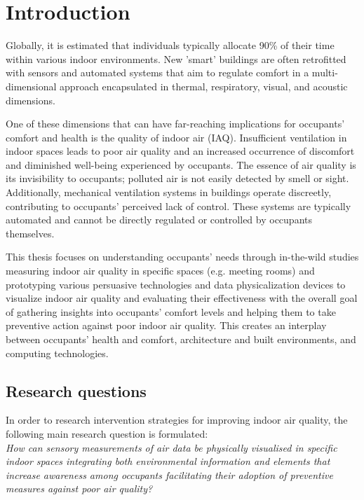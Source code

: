 \section{Introduction}
Globally, it is estimated that individuals typically allocate 90\% of their time within various indoor environments. New 'smart' buildings are often retrofitted with sensors and automated systems that aim to regulate comfort in a multi-dimensional approach encapsulated in thermal, respiratory, visual, and acoustic dimensions. 

One of these dimensions that can have far-reaching implications for occupants' comfort and health is the quality of indoor air (IAQ). Insufficient ventilation in indoor spaces leads to poor air quality and an increased occurrence of discomfort and diminished well-being experienced by occupants. The essence of air quality is its invisibility to occupants; polluted air is not easily detected by smell or sight. Additionally, mechanical ventilation systems in buildings operate discreetly, contributing to occupants' perceived lack of control. These systems are typically automated and cannot be directly regulated or controlled by occupants themselves.

This thesis focuses on understanding occupants' needs through in-the-wild studies measuring indoor air quality in specific spaces (e.g. meeting rooms) and prototyping various persuasive technologies and data physicalization devices to visualize indoor air quality and evaluating their effectiveness with the overall goal of gathering insights into occupants' comfort levels and helping them to take preventive action against poor indoor air quality. This creates an interplay between occupants' health and comfort, architecture and built environments, and computing technologies.



\subsection{Research questions}

In order to research intervention strategies for improving indoor air quality, the following main research question is formulated: \\

\emph{How can sensory measurements of air data be physically visualised in specific indoor spaces integrating both environmental information and elements that increase awareness among occupants facilitating their adoption of preventive measures against poor air quality?} \\

